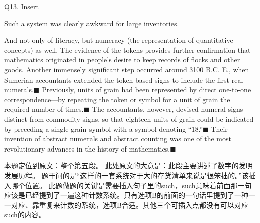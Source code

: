 \begin{blk}
    \begin{qst}
        Q13. Insert
    \end{qst}

    \begin{chc}
        Such a system was clearly awkward for large inventories.
    \end{chc}

    \begin{psgq}
        And not only of literacy, but numeracy (the representation of quantitative concepts) as well. The evidence of the tokens provides further confirmation that mathematics originated in people’s desire to keep records of flocks and other goods. Another immensely significant step occurred around 3100 B.C. E., when Sumerian accountants extended the token-based signs to include the first real numerals.$\blacksquare$ Previously, units of grain had been represented by direct one-to-one correspondence—by repeating the token or symbol for a unit of grain the required number of times.$\blacksquare$ The accountants, however, devised numeral signs distinct from commodity signs, so that eighteen units of grain could be indicated by preceding a single grain symbol with a symbol denoting “18.”$\blacksquare$ Their invention of abstract numerals and abstract counting was one of the most revolutionary advances in the history of mathematics.$\blacksquare$
    \end{psgq}

    \begin{nlz}
        本题定位到原文：整个第五段。 此处原文的大意是：此段主要讲述了数字的发明发展历程。 题干问的是“这样的一套系统对于大的存货清单来说是很笨拙的。”该插入哪个位置。 此题做题的关键是需要插入句子里的such，such意味着前面那一句应该是已经提到了一遍这种计数系统。只有选项B的前面的一句话里提到了一种一一对应、靠重复来计数的系统，选项B合适。其他三个可插入点都没有可以对应such的内容。
    \end{nlz}
\end{blk}

